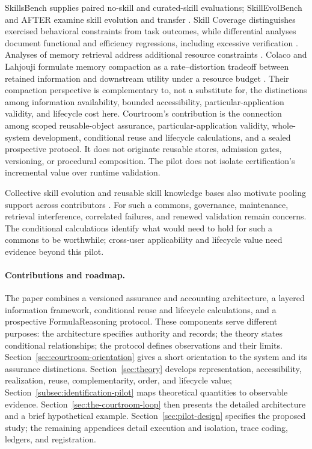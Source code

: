 \documentclass[10pt]{article} %
\providecommand{\1}{\mathbf{1}}  %
\theoremstyle{remark}
\theoremstyle{definition}
\begin{document}
SkillsBench supplies paired no-skill and curated-skill evaluations;
SkillEvolBench and AFTER examine skill evolution and transfer
\citep{li2026skillsbench,skillevolbench2026,belikova2026after}.
Skill Coverage distinguishes exercised behavioral constraints from task
outcomes, while differential analyses document functional and efficiency
regressions, including excessive verification
\citep{tan2026skillcoverage,dong2026skillharm}.
Analyses of memory retrieval address additional resource constraints
\citep{xmemory2026}. Colaco and Lahjouji formulate memory compaction as
a rate--distortion tradeoff between retained information and downstream
utility under a resource budget \citep{colaco2026whattokeep}. Their
compaction perspective is complementary to, not a substitute for, the
distinctions among information availability, bounded accessibility,
particular-application validity, and lifecycle cost here.
Courtroom's contribution is the connection among scoped reusable-object
assurance, particular-application validity, whole-system development,
conditional reuse and lifecycle calculations, and a sealed prospective
protocol. It does not originate reusable stores, admission gates,
versioning, or procedural composition. The pilot does not isolate
certification's incremental value over runtime validation.

Collective skill evolution and reusable skill knowledge bases also
motivate pooling support across contributors
\citep{skillclaw2026,skillx2026}. For such a commons, governance,
maintenance, retrieval interference, correlated failures, and renewed
validation remain concerns. The conditional
calculations identify what would need to hold for such a commons to be
worthwhile; cross-user applicability and lifecycle value need evidence
beyond this pilot.

\paragraph{Contributions and roadmap.}

The paper combines a versioned assurance and accounting architecture, a
layered information framework, conditional reuse and lifecycle
calculations, and a prospective FormulaReasoning protocol. These
components serve different purposes: the architecture specifies authority
and records; the theory states conditional relationships; the protocol
defines observations and their limits.
Section~\ref{sec:courtroom-orientation} gives a short orientation to the
system and its assurance distinctions. Section~\ref{sec:theory} develops
representation, accessibility, realization, reuse, complementarity,
order, and lifecycle value; Section~\ref{subsec:identification-pilot} maps
theoretical quantities to observable evidence.
Section~\ref{sec:the-courtroom-loop} then presents the detailed architecture
and a brief hypothetical example. Section~\ref{sec:pilot-design} specifies the proposed
study; the remaining appendices detail execution and isolation, trace
coding, ledgers, and registration.
\end{document}
